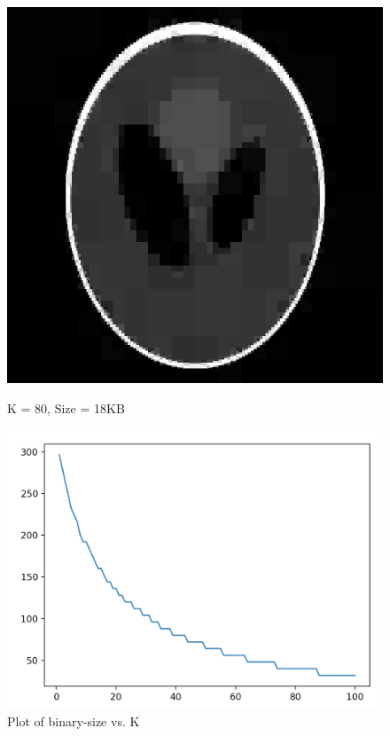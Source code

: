 \documentclass{article}
\begin{document}
    \begin{figure}[!htb]
      \includegraphics[scale=0.4]{./compression/2/80.png}
      \caption{K = 80, Size = 18KB}
    \endminipage \hfill
      \includegraphics[scale=.4]{./compression/plots/c.png}
      \caption{Plot of binary-size vs. K}
    \endminipage
    \end{figure}
\end{document}
